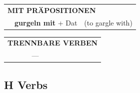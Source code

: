 \documentclass[10pt,a4paper]{revtex4-2}
\begin{document}
\begin{verbbox}
\vspace{10pt}

\begin{tabular}{lll}
\multicolumn{3}{l}{\textbf{MIT PRÄPOSITIONEN}}\\
& \textbf{gurgeln mit} + Dat & (to gargle with)\\
\end{tabular}
\hfill
\begin{tabular}{lll}
\multicolumn{3}{l}{\textbf{TRENNBARE VERBEN}}\\
& ---\\
\end{tabular}
\vspace{-5pt}
\end{verbbox}

\subsection{H Verbs}
\end{document}
